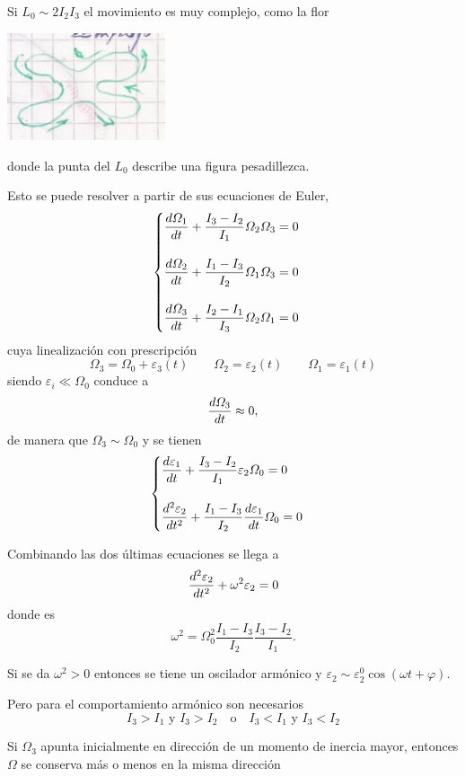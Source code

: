 \documentclass[10pt,oneside]{CBFT_book}
\begin{document}
Si $L_0 \sim 2 I_2 I_3 $ el movimiento es muy complejo, como la flor 

\includegraphics[width=0.35\textwidth]{images/fig_mc_steiner_7.jpg}

donde la punta del $L_0$ describe una figura pesadillezca.

Esto se puede resolver a partir de sus ecuaciones de Euler,
\[	
	\begin{cases}
		\displaystyle \dtot{\Omega_1}{t} + \frac{I_3-I_2}{I_1}\Omega_2\Omega_3 = 0 \\
		\\
		\displaystyle \dtot{\Omega_2}{t} + \frac{I_1-I_3}{I_2}\Omega_1\Omega_3 = 0 \\
		\\
		\displaystyle \dtot{\Omega_3}{t} + \frac{I_2-I_1}{I_3}\Omega_2\Omega_1 = 0
	\end{cases}
\]
cuya linealización con prescripción  
\[
	\Omega_3 = \Omega_0 + \varepsilon_3(t) \qquad \Omega_2 = \varepsilon_2(t) \qquad \Omega_1 = \varepsilon_1(t)
\]
siendo $\varepsilon_i \ll \Omega_0$ conduce a 
\[
	\dtot{\Omega_3}{t} \approx 0,
\]
de manera que $\Omega_3 \sim \Omega_0 $ y se tienen 
\[	
	\begin{cases}
		\displaystyle \dtot{\varepsilon_1}{t} + \frac{I_3-I_2}{I_1}\varepsilon_2\Omega_0 = 0 \\
		\\
		\displaystyle \dtot[2]{\varepsilon_2}{t} + \frac{I_1-I_3}{I_2} \dtot{\varepsilon_1}{t}\Omega_0 = 0 
	\end{cases}
\]

Combinando las dos últimas ecuaciones se llega a 
\[
	\dtot[2]{\varepsilon_2}{t} + \omega^2 \varepsilon_2 = 0 
\]
donde es 
\[
	\omega^2 = \Omega_0^2 \frac{I_1-I_3}{I_2}  \frac{I_3-I_2}{I_1} .
\]

Si se da $\omega^2 > 0$ entonces se tiene un oscilador armónico y $\varepsilon_2 \sim \varepsilon_2^0 \cos(  \omega t + \varphi )$.

Pero para el comportamiento armónico son necesarios
\[
	I_3 > I_1 \text{ y } I_3 > I_2 \quad \mathrm{ o } \quad I_3 < I_1 \text{ y } I_3 < I_2
\]

Si $\Omega_3$ apunta inicialmente en dirección de un momento de inercia mayor, entonces $\Omega$ se conserva más o menos en la misma
dirección
\end{document}
